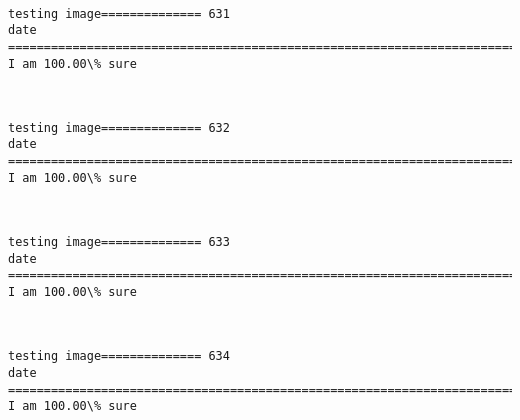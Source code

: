 \documentclass[11pt]{article}
\begin{document}
    \begin{center}
    \end{center}
    { \hspace*{\fill} \\}
    
    \begin{Verbatim}[commandchars=\\\{\}]
testing image============== 631
date
============================================================================
I am 100.00\% sure

    \end{Verbatim}

    \begin{center}
    \end{center}
    { \hspace*{\fill} \\}
    
    \begin{Verbatim}[commandchars=\\\{\}]
testing image============== 632
date
============================================================================
I am 100.00\% sure

    \end{Verbatim}

    \begin{center}
    \end{center}
    { \hspace*{\fill} \\}
    
    \begin{Verbatim}[commandchars=\\\{\}]
testing image============== 633
date
============================================================================
I am 100.00\% sure

    \end{Verbatim}

    \begin{center}
    \end{center}
    { \hspace*{\fill} \\}
    
    \begin{Verbatim}[commandchars=\\\{\}]
testing image============== 634
date
============================================================================
I am 100.00\% sure

    \end{Verbatim}
\end{document}
